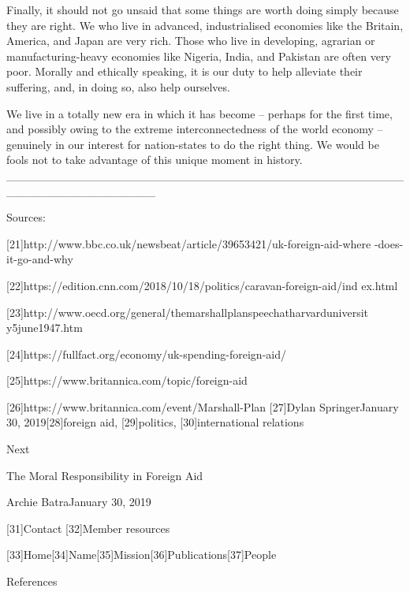    Finally, it should not go unsaid that some things are worth doing
   simply because they are right. We who live in advanced, industrialised
   economies like the Britain, America, and Japan are very rich. Those who
   live in developing, agrarian or manufacturing-heavy economies like
   Nigeria, India, and Pakistan are often very poor. Morally and ethically
   speaking, it is our duty to help alleviate their suffering, and, in
   doing so, also help ourselves.

   We live in a totally new era in which it has become -- perhaps for the
   first time, and possibly owing to the extreme interconnectedness of the
   world economy -- genuinely in our interest for nation-states to do the
   right thing. We would be fools not to take advantage of this unique
   moment in history.
     __________________________________________________________________

   Sources:

   [21]http://www.bbc.co.uk/newsbeat/article/39653421/uk-foreign-aid-where
   -does-it-go-and-why

   [22]https://edition.cnn.com/2018/10/18/politics/caravan-foreign-aid/ind
   ex.html

   [23]http://www.oecd.org/general/themarshallplanspeechatharvarduniversit
   y5june1947.htm

   [24]https://fullfact.org/economy/uk-spending-foreign-aid/

   [25]https://www.britannica.com/topic/foreign-aid

   [26]https://www.britannica.com/event/Marshall-Plan
   [27]Dylan SpringerJanuary 30, 2019[28]foreign aid, [29]politics,
   [30]international relations

   Next

The Moral Responsibility in Foreign Aid

   Archie BatraJanuary 30, 2019

   [31]Contact
   [32]Member resources

   [33]Home[34]Name[35]Mission[36]Publications[37]People

References

